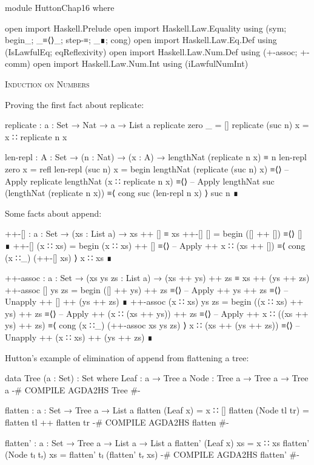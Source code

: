 \documentclass{article}
\begin{document}
\begin{code}
module HuttonChap16 where

open import Haskell.Prelude
open import Haskell.Law.Equality using (sym; begin_; _≡⟨⟩_; step-≡; _∎; cong)
open import Haskell.Law.Eq.Def using (IsLawfulEq; eqReflexivity)
open import Haskell.Law.Num.Def using (+-assoc; +-comm)
open import Haskell.Law.Num.Int using (iLawfulNumInt)
\end{code}

\noindent
\textsc{Induction on Numbers}

\noindent
Proving the first fact about replicate:

\begin{code}
replicate : {a : Set} → Nat → a → List a
replicate zero _ = []
replicate (suc n) x = x ∷ replicate n x

len-repl : {A : Set} → (n : Nat) → (x : A) → lengthNat (replicate n x) ≡ n
len-repl zero x = refl
len-repl (suc n) x =
  begin
    lengthNat (replicate (suc n) x)
  ≡⟨⟩ -- Apply replicate
    lengthNat (x ∷ replicate n x)
  ≡⟨⟩ -- Apply lengthNat
    suc (lengthNat (replicate n x))
  ≡⟨ cong suc (len-repl n x) ⟩
    suc n
  ∎
\end{code}

\noindent
Some facts about append:

\begin{code}
++-[] : {a : Set} → (xs : List a) → xs ++ [] ≡ xs
++-[] [] = begin ([] ++ []) ≡⟨⟩ [] ∎
++-[] (x ∷ xs) =
    begin
      (x ∷ xs) ++ []
    ≡⟨⟩ -- Apply ++
      x ∷ (xs ++ [])
    ≡⟨ cong (x ∷_) (++-[] xs) ⟩
      x ∷ xs
    ∎
\end{code}

\begin{code}
++-assoc : {a : Set} → (xs ys zs : List a)
    → (xs ++ ys) ++ zs ≡ xs ++ (ys ++ zs)
++-assoc [] ys zs =
    begin
      ([] ++ ys) ++ zs
    ≡⟨⟩ -- Apply ++
      ys ++ zs
    ≡⟨⟩ -- Unapply ++
      [] ++ (ys ++ zs)
    ∎
++-assoc (x ∷ xs) ys zs =
    begin
      ((x ∷ xs) ++ ys) ++ zs
    ≡⟨⟩ -- Apply ++
      (x ∷ (xs ++ ys)) ++ zs
    ≡⟨⟩ -- Apply ++
      x ∷ ((xs ++ ys) ++ zs)
    ≡⟨ cong (x ∷_) (++-assoc xs ys zs) ⟩
      x ∷ (xs ++ (ys ++ zs))
    ≡⟨⟩ -- Unapply ++
      (x ∷ xs) ++ (ys ++ zs)
    ∎
\end{code}

\noindent Hutton's example of elimination of append from flattening a tree:

\begin{code}
data Tree (a : Set) : Set where
    Leaf : a → Tree a
    Node : Tree a → Tree a → Tree a
{-# COMPILE AGDA2HS Tree #-}

flatten : {a : Set} → Tree a → List a
flatten (Leaf x) = x ∷ []
flatten (Node tl tr) = flatten tl ++ flatten tr
{-# COMPILE AGDA2HS flatten #-}

flatten' : {a : Set } → Tree a → List a → List a
flatten' (Leaf x) xs = x ∷ xs
flatten' (Node tₗ tᵣ) xs = flatten' tₗ (flatten' tᵣ xs)
{-# COMPILE AGDA2HS flatten' #-}
\end{code}
\end{document}
